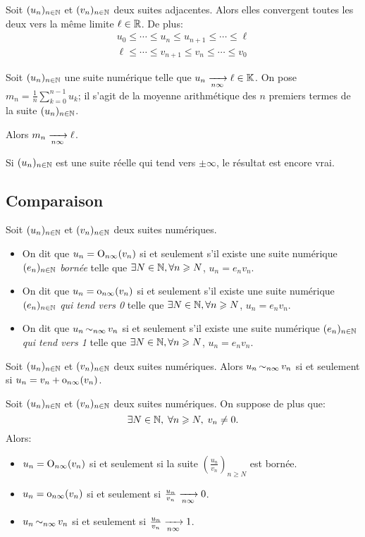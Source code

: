 \documentclass{yann}
\newcommand\U{(u_n)_{n\in\N}}
\newcommand\V{(v_n)_{n\in\N}}
\begin{document}

Soit $\U$ et $\V$ deux suites adjacentes.
Alors elles convergent toutes les deux vers la même limite $\ell\in\mathbb{R}$.
De plus:
\begin{multline*}
u_0\leq\cdots\leq u_n\leq u_{n+1}\leq\cdots\leq\ell \\
\ell\leq\cdots\leq v_{n+1}\leq v_n\leq\cdots\leq v_0
\end{multline*}


Soit $\U$ une suite numérique telle que $u_n \xrightarrow[{n\infty}]{}\ell\in\mathbb{K}$.
On pose $m_n = \frac{1}{n}\sum_{k=0}^{n-1} u_k$;
il s'agit de la moyenne arithmétique des $n$ premiers termes de la suite $\U$.

Alors $m_n \xrightarrow[{n\infty}]{}\ell$.


Si $\U$ est une suite réelle qui tend vers $\pm\infty$, le résultat est encore vrai.

\subsection{Comparaison}


Soit $\U$ et $\V$ deux suites numériques.
\begin{itemize}
\item
On dit que \emph{$u_n = \operatorname*{O}_{n\infty}(v_n)$} si et seulement s'il existe
  une suite numérique $(e_n)_{n\in\mathbb{N}}$ \emph{bornée} telle que
  $\exists N\in\mathbb{N},\forall n\geqslant N$, $u_n = e_n v_n$.
\item
On dit que \emph{$u_n = \operatorname*{o}_{n\infty}(v_n)$} si et seulement s'il existe
  une suite numérique $(e_n)_{n\in\mathbb{N}}$ \emph{qui tend vers 0} telle que
  $\exists N\in\mathbb{N},\forall n\geqslant N$, $u_n = e_n v_n$.
\item
On dit que \emph{$u_n \operatorname*{\sim}_{n\infty} v_n$} si et seulement s'il existe
  une suite numérique $(e_n)_{n\in\mathbb{N}}$ \emph{qui tend vers 1} telle que
  $\exists N\in\mathbb{N},\forall n\geqslant N$, $u_n = e_n v_n$.
\end{itemize}


Soit $\U$ et $\V$ deux suites numériques.
Alors $u_n \operatorname*{\sim}_{n\infty} v_n$ si et seulement si $u_n = v_n + \operatorname*{o}_{n\infty}(v_n)$.


Soit $\U$ et $\V$ deux suites numériques.
On suppose de plus que:
\[ \exists N\in\mathbb{N},\;\forall n\geqslant N,\; v_n\neq0. \]
Alors:
\begin{itemize}
\item
$u_n = \operatorname*{O}_{n\infty}(v_n)$ si et seulement si la suite $\left(\frac{u_n}{v_n}\right)_{n\geq N}$ est bornée.
\item
$u_n = \operatorname*{o}_{n\infty}(v_n)$ si et seulement si $\frac{u_n}{v_n} \xrightarrow[{n\infty}]{} 0$.
\item
$u_n \operatorname*{\sim}_{n\infty} v_n$ si et seulement si $\frac{u_n}{v_n} \xrightarrow[{n\infty}]{} 1$.
\end{itemize}
\end{document}
